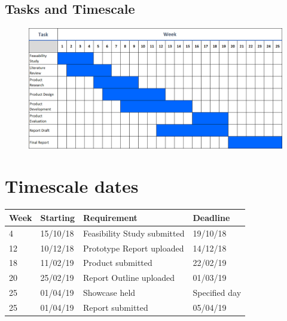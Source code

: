 \documentclass{article}
\begin{document}
	\begin{landscape}
		
		\section{Tasks and Timescale}
		
		\begin{figure}[ht]
			\centering
			\includegraphics[width=\linewidth, height=\textheight,keepaspectratio]{gantt.png}
		\end{figure}

	\end{landscape}

	\section{Timescale dates}
	\begin{table}[h]
		\begin{tabular}{@{}llll@{}}
		\toprule
		Week & Starting & Requirement                 & Deadline      \\ \midrule
		4    & 15/10/18 & Feasibility Study submitted & 19/10/18      \\
		12   & 10/12/18 & Prototype Report uploaded   & 14/12/18      \\
		18   & 11/02/19 & Product submitted           & 22/02/19      \\
		20   & 25/02/19 & Report Outline uploaded     & 01/03/19      \\
		25   & 01/04/19 & Showcase held               & Specified day \\
		25   & 01/04/19 & Report submitted            & 05/04/19      \\ \bottomrule
		\end{tabular}
		\end{table}
		
\end{document}
